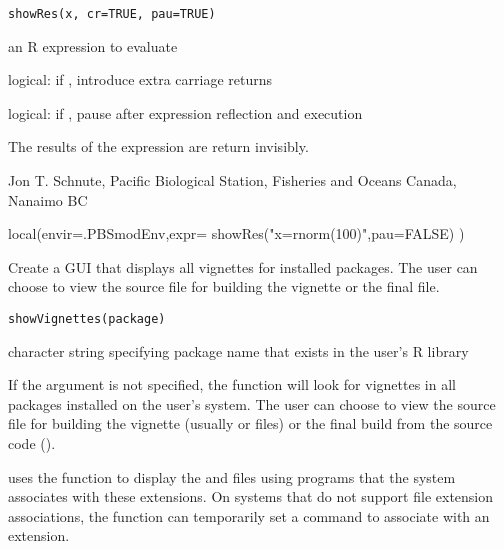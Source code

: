 \documentclass[letterpaper]{book}
\begin{document}
%
\begin{Usage}
\begin{verbatim}
showRes(x, cr=TRUE, pau=TRUE)
\end{verbatim}
\end{Usage}
%
\begin{Arguments}
\begin{ldescription}
\item[\code{x}] an R expression to evaluate
\item[\code{cr}] logical: if , introduce extra carriage returns
\item[\code{pau}] logical: if , pause after expression reflection and execution
\end{ldescription}
\end{Arguments}
%
\begin{Value}
The results of the expression are return invisibly.
\end{Value}
%
\begin{Author}\relax
Jon T. Schnute, Pacific Biological Station, Fisheries and Oceans Canada, Nanaimo BC
\end{Author}
%
\begin{Examples}
\begin{ExampleCode}
local(envir=.PBSmodEnv,expr={
  showRes("x=rnorm(100)",pau=FALSE)
})
\end{ExampleCode}
\end{Examples}
%
\begin{Description}\relax
Create a GUI that displays all vignettes for installed packages. 
The user can choose to view the source file for building the vignette 
or the final  file.
\end{Description}
%
\begin{Usage}
\begin{verbatim}
showVignettes(package)
\end{verbatim}
\end{Usage}
%
\begin{Arguments}
\begin{ldescription}
\item[\code{package}] character string specifying package name that exists in the user's R library
\end{ldescription}
\end{Arguments}
%
\begin{Details}\relax
If the argument  is not specified, the function
will look for vignettes in all packages installed on the user's 
system. The user can choose to view the source file 
for building the vignette (usually  or  files)
or the final build from the source code ().

 uses the  function 
 to display the  and  files 
using programs that the system associates with these extensions. 
On systems that do not support file extension associations, the 
function  can temporarily set a command to associate 
with an extension.
\end{Details}
\end{document}
